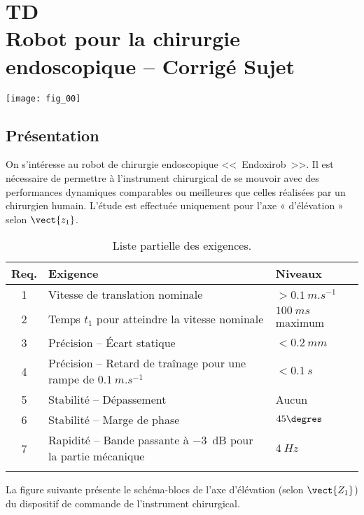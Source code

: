 \chapter*{TD  \\ 
Robot pour la chirurgie endoscopique -- \ifprof Corrigé \else Sujet \fi}
\iflivret {} \else
\ifprof  {} \else \fi
\fi
\setcounter{question}{0}

\begin{marginfigure}
\centering
\texttt{[image: fig\_00]}
\end{marginfigure}

\section*{Présentation}
\ifprof
\else
On s’intéresse au robot de chirurgie endoscopique <<~Endoxirob~>>. Il est nécessaire de permettre à l’instrument chirurgical de se mouvoir avec des performances dynamiques comparables ou meilleures que celles réalisées par un chirurgien humain. 
L’étude est effectuée uniquement pour l’axe « d’élévation » selon $\vect{z_1}$. 


\begin{table*}[!h]
\centering
\begin{tabular}{cp{10cm}p{3cm}}
\hline 
Req. & Exigence & Niveaux \\ \hline
1 & Vitesse de translation nominale & $>\SI{0,1}{m.s^{-1}}$ \\ 
2 & Temps $t_1$ pour atteindre la vitesse nominale & $\SI{100}{ms}$ maximum \\ 
3 & Précision -- Écart statique & $<\SI{0,2}{mm}$ \\ 
4 & Précision --  Retard de traînage pour une rampe de $ \SI{0,1}{m.s^{-1}}$  & $<\SI{0,1}{s}$ \\ 
5 & Stabilité -- Dépassement & Aucun \\ 
6 & Stabilité -- Marge de phase & $45\degres$ \\ 
7 & Rapidité -- Bande passante à \SI{-3}{dB} pour la partie mécanique & $\SI{4}{Hz}$ \\
\hline
\caption{Liste partielle des exigences.}
\end{tabular}
\end{table*}
La figure suivante présente le schéma-blocs de l'axe d’élévation (selon $\vect{Z_1}$) du dispositif de commande de l’instrument chirurgical. 


